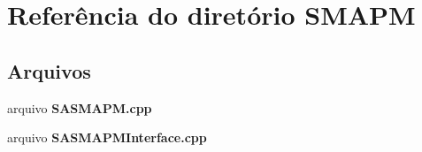 \section{Referência do diretório S\+M\+A\+PM}
\label{dir_de2a3a3f2a39cc542cb86b306cd3b779}
\subsection*{Arquivos}
\begin{DoxyCompactItemize}
\item 
arquivo {\bf S\+A\+S\+M\+A\+P\+M.\+cpp}
\item 
arquivo {\bf S\+A\+S\+M\+A\+P\+M\+Interface.\+cpp}
\end{DoxyCompactItemize}
